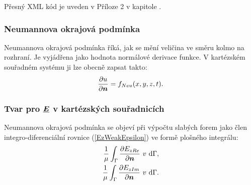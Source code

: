 \documentclass[12pt,a4paper,oneside]{article}
\numberwithin{equation}{section} %
\numberwithin{figure}{section} %
\numberwithin{table}{section} %
\renewcommand{\vec}[1]{\mbox{\boldmath$#1$}} %
\newcommand{\faz}[1]{{\underline{#1}}} %
\begin{document}
Přesný XML kód je uveden v Příloze 2 v kapitole .


\subsubsection{Neumannova okrajová podmínka}
Neumannova okrajová podmínka říká, jak se mění veličina ve směru kolmo na rozhraní. Je vyjádřena jako hodnota normálové derivace funkce. V kartézském souřadném systému ji lze obecně zapsat takto:
\begin{equation}
\frac{\partial u}{\partial \vec{n}} = f _{Neu} (x, y, z, t) .
\end{equation}

\subsubsection*{Tvar pro $\faz{\vec{E}}$ v kartézských souřadnicích}
\label{NeumannEK}
Neumannova okrajová podmínka se objeví při výpočtu slabých forem jako člen integro-diferenciální rovnice (\ref{EzWeakEpsilon}) ve formě plošného integrálu:
\begin{subequations}
\label{weakneumann}
\begin{align}
\frac{1}{\mu} \int _{\Gamma} \frac{\partial E _{z Re}}{\partial \vec{n}} ~ v ~ \ud \Gamma ,
\\ 
\frac{1}{\mu} \int _{\Gamma} \frac{\partial E _{z Im}}{\partial \vec{n}} ~ v ~ \ud \Gamma .
\end{align}
\end{subequations}
\end{document}
